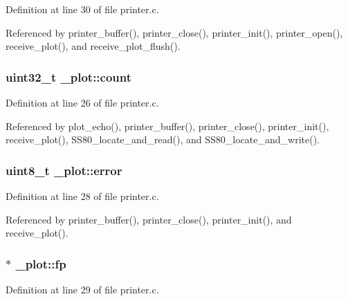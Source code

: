 Definition at line 30 of file printer.\+c.



Referenced by printer\+\_\+buffer(), printer\+\_\+close(), printer\+\_\+init(), printer\+\_\+open(), receive\+\_\+plot(), and receive\+\_\+plot\+\_\+flush().

\subsubsection[{\texorpdfstring{count}{count}}]{\setlength{\rightskip}{0pt plus 5cm}uint32\+\_\+t \+\_\+plot\+::count}\hypertarget{struct__plot_af4d84e2aa52eabdc7ccc2fbf18272e98}{}\label{struct__plot_af4d84e2aa52eabdc7ccc2fbf18272e98}


Definition at line 26 of file printer.\+c.



Referenced by plot\+\_\+echo(), printer\+\_\+buffer(), printer\+\_\+close(), printer\+\_\+init(), receive\+\_\+plot(), S\+S80\+\_\+locate\+\_\+and\+\_\+read(), and S\+S80\+\_\+locate\+\_\+and\+\_\+write().

\subsubsection[{\texorpdfstring{error}{error}}]{\setlength{\rightskip}{0pt plus 5cm}uint8\+\_\+t \+\_\+plot\+::error}\hypertarget{struct__plot_a9a9516230fefbc6cdd6e4ca5d6403509}{}\label{struct__plot_a9a9516230fefbc6cdd6e4ca5d6403509}


Definition at line 28 of file printer.\+c.



Referenced by printer\+\_\+buffer(), printer\+\_\+close(), printer\+\_\+init(), and receive\+\_\+plot().

\subsubsection[{\texorpdfstring{fp}{fp}}]{$\ast$ \+\_\+plot\+::fp}\hypertarget{struct__plot_aec1bc5aae9d9c56584ee0cbb31515ac6}{}\label{struct__plot_aec1bc5aae9d9c56584ee0cbb31515ac6}


Definition at line 29 of file printer.\+c.




